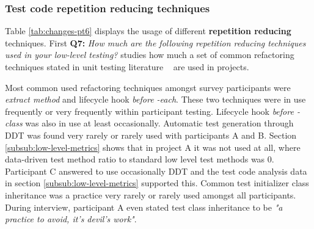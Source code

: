 \subsubsection{Test code repetition reducing techniques}

Table \ref{tab:changes-pt6} displays the usage of different \textbf{repetition reducing} techniques. First \textbf{Q7:}
\textit{How much are the following repetition reducing techniques used in your low-level testing?} studies how much a
set of common refactoring techniques stated in unit testing literature ~\cite{artofunit2013} are used in projects.

Most common used refactoring techniques amongst survey participants were \textit{extract method} and lifecycle hook \textit{before -each}.
These two techniques were in use frequently or very frequently within participant testing. Lifecycle hook \textit{before -class} was also
in use at least occasionally. Automatic test generation through DDT was found very rarely or rarely used with participants A
and B. Section \ref{subsub:low-level-metrics} shows that in project A it was not used at all, where data-driven test method ratio to standard
low level test methods was 0. Participant C answered to use occasionally DDT and the test code analysis
data in section \ref{subsub:low-level-metrics} supported this. Common test initializer class inheritance was a practice
very rarely or rarely used amongst all participants. During interview, participant A even stated test class inheritance
to be \textit{"a practice to avoid, it's devil's work"}.

